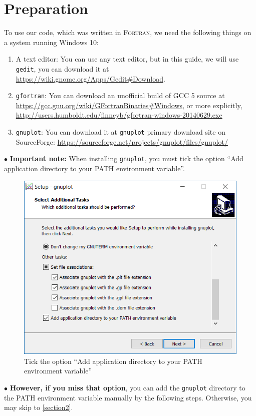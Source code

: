 \documentclass[a4paper,oneside]{book}
\numberwithin{equation}{chapter}
\begin{document}
	\section{Preparation}
	To use our code, which was written in \textsc{Fortran}, we need the following things on a system running Windows 10:
	\begin{enumerate}
		\item A text editor: You can use any text editor, but in this guide, we will use \texttt{gedit}, you can download it at \url{https://wiki.gnome.org/Apps/Gedit#Download}.
		\item \texttt{gfortran}: You can download an unofficial build of GCC 5 source at \url{https://gcc.gnu.org/wiki/GFortranBinaries#Windows}, or more explicitly, \url{http://users.humboldt.edu/finneyb/gfortran-windows-20140629.exe}
		\item \texttt{gnuplot}: You can download it at \texttt{gnuplot} primary download site on SourceForge: \url{https://sourceforge.net/projects/gnuplot/files/gnuplot/}
	\end{enumerate}
	\noindent$\bullet$ \textbf{Important note:} When installing \texttt{gnuplot}, you must tick the option ``Add application directory to your PATH environment variable''.
	\begin{figure}[H]
		\centering	\includegraphics[width=15cm]{wfigextra1}
		\caption{Tick the option ``Add application directory to your PATH environment variable''}
	\end{figure}
	\noindent$\bullet$ \textbf{However, if you miss that option}, you can add the \texttt{gnuplot} directory to the PATH environment variable manually by the following steps. Otherwise, you may skip to \autoref{section2}.
\end{document}
